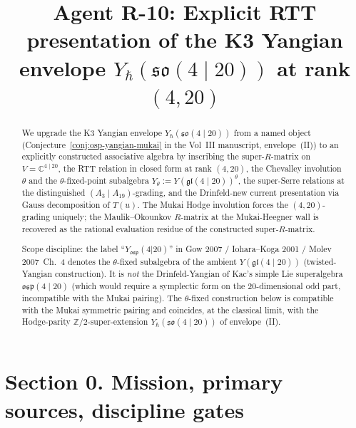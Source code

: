 \documentclass{article}
\title{Agent R-10: Explicit RTT presentation of the K3 Yangian envelope
  $Y_\hbar(\mathfrak{so}(4 \mid 20))$ at rank $(4, 20)$}
\author{}
\date{}
\providecommand{\C}{\mathbb C}
\providecommand{\Z}{\mathbb Z}
\providecommand{\fgl}{\mathfrak{gl}}
\providecommand{\fso}{\mathfrak{so}}
\theoremstyle{definition}
\begin{document}
\maketitle

\begin{abstract}
We upgrade the K3 Yangian envelope
$Y_\hbar(\mathfrak{so}(4 \mid 20))$ from a named object
(Conjecture~\ref{conj:osp-yangian-mukai} in the Vol~III manuscript,
envelope~(II)) to an explicitly constructed associative algebra by
inscribing the super-$R$-matrix on $V = \C^{4 \mid 20}$, the RTT
relation in closed form at rank $(4, 20)$, the Chevalley involution
$\theta$ and the $\theta$-fixed-point subalgebra
$Y_\theta := Y(\fgl(4 \mid 20))^\theta$, the super-Serre relations at
the distinguished $(A_3 \mid A_{19})$-grading, and the
Drinfeld-new current presentation via Gauss decomposition of $T(u)$.
The Mukai Hodge involution forces the $(4, 20)$-grading uniquely; the
Maulik--Okounkov $R$-matrix at the Mukai-Heegner wall is recovered as
the rational evaluation residue of the constructed super-$R$-matrix.

Scope discipline: the label ``$Y_{\mathfrak{osp}}(4|20)$'' in Gow 2007
/ Iohara--Koga 2001 / Molev 2007~Ch.~4 denotes the $\theta$-fixed
subalgebra of the ambient $Y(\fgl(4 \mid 20))$ (twisted-Yangian
construction). It is \emph{not} the Drinfeld-Yangian of Kac's simple
Lie superalgebra $\mathfrak{osp}(4 \mid 20)$ (which would require a
symplectic form on the $20$-dimensional odd part, incompatible with
the Mukai pairing). The $\theta$-fixed construction below is
compatible with the Mukai symmetric pairing and coincides, at the
classical limit, with the Hodge-parity $\Z/2$-super-extension
$Y_\hbar(\fso(4 \mid 20))$ of envelope~(II).
\end{abstract}

\tableofcontents

\section*{Section 0. Mission, primary sources, discipline gates}
\end{document}
